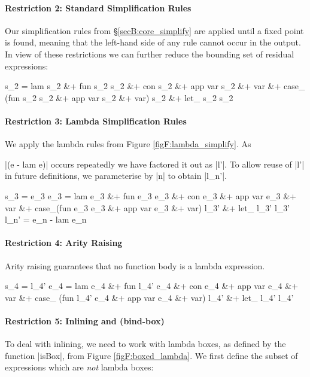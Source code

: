 \paragraph{Restriction 2: Standard Simplification Rules}
Our simplification rules from \S\ref{secB:core_simplify} are applied until a fixed point is found, meaning that the left-hand side of any rule cannot occur in the output.  In view of these restrictions we can further reduce the bounding set of residual expressions:

\ignore\begin{code}
s_2  =  lam s_2 &+ fun s_2 s_2 &+ con s_2 &+ app var s_2 &+ var &+
        case_ (fun s_2 s_2 &+ app var s_2 &+ var) s_2 &+ let_ s_2 s_2
\end{code}

\paragraph{Restriction 3: Lambda Simplification Rules}
We apply the lambda rules from Figure \ref{figF:lambda_simplify}. As \ignore|(e - lam e)| occurs repeatedly we have factored it out as |l'|. To allow reuse of |l'| in future definitions, we parameterise by |n| to obtain |l_n'|.

\ignore\begin{code}
s_3   =  e_3
e_3   =  lam e_3 &+ fun e_3 e_3 &+ con e_3 &+ app var e_3 &+ var &+
         case_(fun e_3 e_3 &+ app var e_3 &+ var) l_3' &+ let_ l_3' l_3'
l_n'  =  e_n - lam e_n
\end{code}

\paragraph{Restriction 4: Arity Raising}
Arity raising guarantees that no function body is a lambda expression.

\ignore\begin{code}
s_4   =  l_4'
e_4   =  lam e_4 &+ fun l_4' e_4 &+ con e_4 &+ app var e_4 &+ var &+
         case_ (fun l_4' e_4 &+ app var e_4 &+ var) l_4' &+ let_ l_4' l_4'
\end{code}

\paragraph{Restriction 5: Inlining and (bind-box)}
To deal with inlining, we need to work with lambda boxes, as defined by the function |isBox|, from Figure \ref{figF:boxed_lambda}. We first define the subset of expressions which are \textit{not} lambda boxes:

